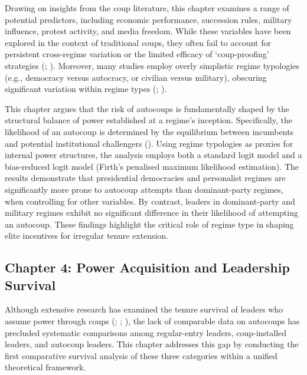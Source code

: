 \documentclass[
  12pt,
]{report}
\begin{document}
Drawing on insights from the coup literature, this chapter examines a
range of potential predictors, including economic performance,
succession rules, military influence, protest activity, and media
freedom. While these variables have been explored in the context of
traditional coups, they often fail to account for persistent
cross-regime variation or the limited efficacy of `coup-proofing'
strategies (;
). Moreover, many studies employ
overly simplistic regime typologies (e.g., democracy versus autocracy,
or civilian versus military), obscuring significant variation within
regime types (;
).

This chapter argues that the risk of autocoups is fundamentally shaped
by the structural balance of power established at a regime's inception.
Specifically, the likelihood of an autocoup is determined by the
equilibrium between incumbents and potential institutional challengers
(). Using
regime typologies as proxies for internal power structures, the analysis
employs both a standard logit model and a bias-reduced logit model
(Firth's penalised maximum likelihood estimation). The results
demonstrate that presidential democracies and personalist regimes are
significantly more prone to autocoup attempts than dominant-party
regimes, when controlling for other variables. By contrast, leaders in
dominant-party and military regimes exhibit no significant difference in
their likelihood of attempting an autocoup. These findings highlight the
critical role of regime type in shaping elite incentives for irregular
tenure extension.

\subsection*{Chapter 4: Power Acquisition and Leadership
Survival}\label{chapter-4-power-acquisition-and-leadership-survival}

Although extensive research has examined the tenure survival of leaders
who assume power through coups (; ;
), the lack of
comparable data on autocoups has precluded systematic comparisons among
regular-entry leaders, coup-installed leaders, and autocoup leaders.
This chapter addresses this gap by conducting the first comparative
survival analysis of these three categories within a unified theoretical
framework.
\end{document}
